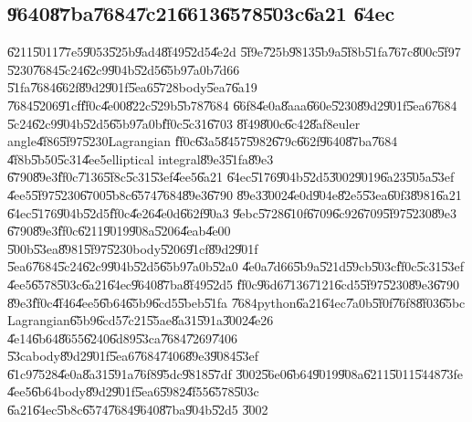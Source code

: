 \documentclass[12pt]{article}
\begin{document}
\subsection{\U{9640}\U{87ba}\U{7684}\U{7c21}\U{6613}\U{6578}\U{503c}\U{6a21}%
\U{64ec}}

\U{6211}\U{5011}\U{77e5}\U{9053}\U{525b}\U{9ad4}\U{8f49}\U{52d5}\U{4e2d}%
\U{5f9e}\U{725b}\U{9813}\U{5b9a}\U{5f8b}\U{51fa}\U{767c}\U{800c}\U{5f97}%
\U{5230}\U{7684}\U{5c24}\U{62c9}\U{904b}\U{52d5}\U{65b9}\U{7a0b}\U{7d66}%
\U{51fa}\U{7684}\U{662f}\U{89d2}\U{901f}\U{5ea6}\U{5728}body\U{5ea7}\U{6a19}%
\U{7684}\U{5206}\U{91cf}\U{ff0c}\U{4e00}\U{822c}\U{529b}\U{5b78}\U{7684}%
\U{66f8}\U{4e0a}\U{8aaa}\U{660e}\U{5230}\U{89d2}\U{901f}\U{5ea6}\U{7684}%
\U{5c24}\U{62c9}\U{904b}\U{52d5}\U{65b9}\U{7a0b}\U{ff0c}\U{5c31}\U{6703}%
\U{8f49}\U{800c}\U{6c42}\U{8af8}euler angle\U{4f86}\U{5f97}\U{5230}Lagrangian%
\U{ff0c}\U{63a5}\U{8457}\U{5982}\U{679c}\U{662f}\U{9640}\U{87ba}\U{7684}%
\U{4f8b}\U{5b50}\U{5c31}\U{4ee5}elliptical integral\U{89e3}\U{51fa}\U{89e3}%
\U{6790}\U{89e3}\U{ff0c}\U{7136}\U{5f8c}\U{5c31}\U{53ef}\U{4ee5}\U{6a21}%
\U{64ec}\U{5176}\U{904b}\U{52d5}\U{3002}\U{9019}\U{6a23}\U{505a}\U{53ef}%
\U{4ee5}\U{5f97}\U{5230}\U{6700}\U{5b8c}\U{6574}\U{7684}\U{89e3}\U{6790}%
\U{89e3}\U{3002}\U{4e0d}\U{904e}\U{82e5}\U{53ea}\U{60f3}\U{8981}\U{6a21}%
\U{64ec}\U{5176}\U{904b}\U{52d5}\U{ff0c}\U{4e26}\U{4e0d}\U{662f}\U{90a3}%
\U{9ebc}\U{5728}\U{610f}\U{6709}\U{6c92}\U{6709}\U{5f97}\U{5230}\U{89e3}%
\U{6790}\U{89e3}\U{ff0c}\U{6211}\U{9019}\U{908a}\U{5206}\U{4eab}\U{4e00}%
\U{500b}\U{53ea}\U{8981}\U{5f97}\U{5230}body\U{5206}\U{91cf}\U{89d2}\U{901f}%
\U{5ea6}\U{7684}\U{5c24}\U{62c9}\U{904b}\U{52d5}\U{65b9}\U{7a0b}\U{52a0}%
\U{4e0a}\U{7d66}\U{5b9a}\U{521d}\U{59cb}\U{503c}\U{ff0c}\U{5c31}\U{53ef}%
\U{4ee5}\U{6578}\U{503c}\U{6a21}\U{64ec}\U{9640}\U{87ba}\U{8f49}\U{52d5}%
\U{ff0c}\U{96d6}\U{7136}\U{7121}\U{6cd5}\U{5f97}\U{5230}\U{89e3}\U{6790}%
\U{89e3}\U{ff0c}\U{4f46}\U{4ee5}\U{6b64}\U{65b9}\U{6cd5}\U{5beb}\U{51fa}%
\U{7684}python\U{6a21}\U{64ec}\U{7a0b}\U{5f0f}\U{76f8}\U{8f03}\U{65bc}%
Lagrangian\U{65b9}\U{6cd5}\U{7c21}\U{55ae}\U{8a31}\U{591a}\U{3002}\U{4e26}%
\U{4e14}\U{6b64}\U{8655}\U{6240}\U{6d89}\U{53ca}\U{7684}\U{7269}\U{7406}%
\U{53ca}body\U{89d2}\U{901f}\U{5ea6}\U{7684}\U{7406}\U{89e3}\U{9084}\U{53ef}%
\U{61c9}\U{7528}\U{4e0a}\U{8a31}\U{591a}\U{76f8}\U{95dc}\U{9818}\U{57df}%
\U{3002}\U{56e0}\U{6b64}\U{9019}\U{908a}\U{6211}\U{5011}\U{5448}\U{73fe}%
\U{4ee5}\U{6b64}body\U{89d2}\U{901f}\U{5ea6}\U{5982}\U{4f55}\U{6578}\U{503c}%
\U{6a21}\U{64ec}\U{5b8c}\U{6574}\U{7684}\U{9640}\U{87ba}\U{904b}\U{52d5}%
\U{3002}
\end{document}
